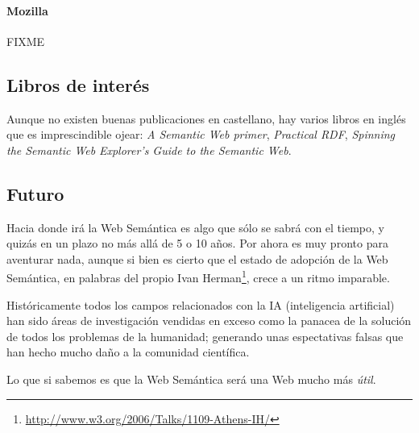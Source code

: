 \paragraph{Mozilla}

FIXME

\subsection{Libros de interés}

Aunque no existen buenas publicaciones en castellano, hay varios libros en inglés 
que es imprescindible ojear: \emph{A Semantic Web primer}\cite{SemanticWebPrimer},
\emph{Practical RDF}\cite{PracticalRDF}, 
\emph{Spinning the Semantic Web}\cite{SpinningSemanticWeb}
\emph{Explorer's Guide to the Semantic Web}\cite{ExplorerSemanticWeb}.

\subsection{Futuro}

Hacia donde irá la Web Semántica es algo que sólo se sabrá con el tiempo, y quizás
en un plazo no más allá de 5 o 10 años. Por ahora es muy pronto para aventurar nada,
aunque si bien es cierto que el estado de adopción de la Web Semántica, en palabras
del propio Ivan Herman\footnote{\url{http://www.w3.org/2006/Talks/1109-Athens-IH/}},
crece a un ritmo imparable.

Históricamente todos los campos relacionados con la IA (inteligencia artificial) 
han sido áreas de investigación vendidas en exceso como la panacea de la solución 
de todos los problemas de la humanidad; generando unas espectativas falsas que han 
hecho mucho daño a la comunidad científica.

Lo que si sabemos es que la Web Semántica será una Web mucho más \emph{útil}.
